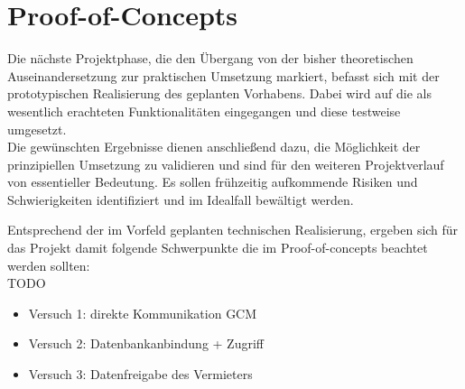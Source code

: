 
\section{Proof-of-Concepts}
Die nächste Projektphase, die den Übergang von der bisher theoretischen Auseinandersetzung zur praktischen Umsetzung markiert, befasst sich mit der prototypischen Realisierung des geplanten Vorhabens. Dabei wird auf die als wesentlich erachteten  Funktionalitäten eingegangen und diese testweise umgesetzt.\\
Die gewünschten Ergebnisse dienen anschließend dazu, die Möglichkeit der prinzipiellen Umsetzung zu validieren und sind für den weiteren Projektverlauf von essentieller Bedeutung. Es sollen frühzeitig aufkommende Risiken und Schwierigkeiten identifiziert  und im Idealfall bewältigt werden.

\vspace{0.5cm}

Entsprechend der im Vorfeld geplanten technischen Realisierung, ergeben sich für das Projekt damit folgende Schwerpunkte die im Proof-of-concepts beachtet werden sollten:\\
TODO
\begin{itemize}
   \item Versuch 1: direkte Kommunikation GCM
   \item Versuch 2: Datenbankanbindung + Zugriff
   \item Versuch 3: Datenfreigabe des Vermieters
   



  
\end{itemize}